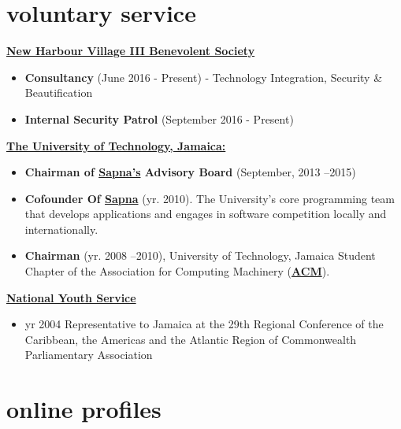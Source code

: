 \documentclass[]{friggeri-cvRS}
\begin{document}

\section{voluntary service}
\textbf{\underline{New Harbour Village III Benevolent Society}}
	\begin{itemize}
		\item \textbf{Consultancy} (June 2016 - Present) -  Technology Integration, Security \& Beautification
		\item \textbf{Internal Security Patrol} (September 2016 - Present)
	\end{itemize}
\textbf{\underline{The University of Technology, Jamaica:}}
	\begin{itemize}
		\item \textbf{Chairman of \href{https://www.utechsapna.com/home/about}{Sapna's} Advisory Board} (September, 2013 –2015)
		\item \textbf{Cofounder Of \href{https://www.utechsapna.com/home/about}{Sapna}} (yr. 2010). The University’s core programming team that develops applications and engages in software competition locally and internationally.
		\item \textbf{Chairman} (yr. 2008 –2010), University of Technology, Jamaica Student Chapter of the Association for Computing Machinery (\textbf{\href{http://www.acm.org/}{ACM}}).
	\end{itemize}
\textbf{\underline{National Youth Service}}
	\begin{itemize}
		\item yr 2004 Representative to Jamaica at the 29th Regional Conference of the Caribbean, the Americas and the Atlantic Region of Commonwealth Parliamentary Association
	\end{itemize}


\section{online profiles}
\end{document}
